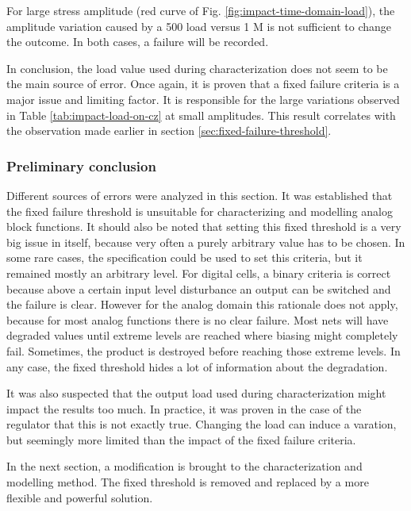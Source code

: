 For large stress amplitude (red curve of Fig. \ref{fig:impact-time-domain-load}), the amplitude variation caused by a 500 \textOmega{} load versus 1 M\textOmega{} is not sufficient to change the outcome.
In both cases, a failure will be recorded.

In conclusion, the load value used during characterization does not seem to be the main source of error.
Once again, it is proven that a fixed failure criteria is a major issue and limiting factor.
It is responsible for the large variations observed in Table \ref{tab:impact-load-on-cz} at small amplitudes.
This result correlates with the observation made earlier in section \ref{sec:fixed-failure-threshold}.

\subsubsection{Preliminary conclusion}

Different sources of errors were analyzed in this section.
It was established that the fixed failure threshold is unsuitable for characterizing and modelling analog block functions.
It should also be noted that setting this fixed threshold is a very big issue in itself, because very often a purely arbitrary value has to be chosen.
In some rare cases, the specification could be used to set this criteria, but it remained mostly an arbitrary level.
For digital cells, a binary criteria is correct because above a certain input level disturbance an output can be switched and the failure is clear.
However for the analog domain this rationale does not apply, because for most analog functions there is no clear failure.
Most nets will have degraded values until extreme levels are reached where biasing might completely fail.
Sometimes, the product is destroyed before reaching those extreme levels.
In any case, the fixed threshold hides a lot of information about the degradation.

It was also suspected that the output load used during characterization might impact the results too much.
In practice, it was proven in the case of the regulator that this is not exactly true.
Changing the load can induce a varation, but seemingly more limited than the impact of the fixed failure criteria.

In the next section, a modification is brought to the characterization and modelling method.
The fixed threshold is removed and replaced by a more flexible and powerful solution.
